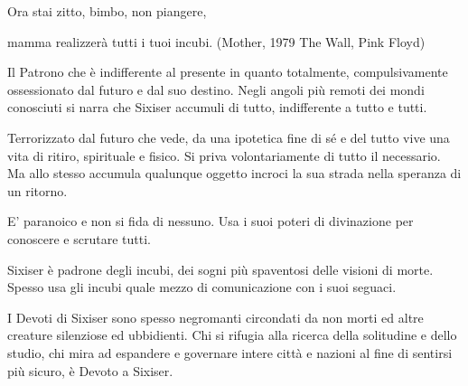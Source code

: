 \begin{multicols}{2}
\begin{enfasi}
{Ora stai zitto, bimbo, non piangere,

mamma realizzerà tutti i tuoi incubi. (Mother, 1979 The Wall, Pink Floyd)

}\end{enfasi}

Il Patrono che è indifferente al presente in quanto totalmente, compulsivamente ossessionato dal futuro e dal suo destino. Negli angoli più remoti dei mondi conosciuti si narra che Sixiser accumuli di tutto, indifferente a tutto e tutti.

Terrorizzato dal futuro che vede, da una ipotetica fine di sé e del tutto vive una vita di ritiro, spirituale e fisico. Si priva volontariamente di tutto il necessario. Ma allo stesso accumula qualunque oggetto incroci la sua strada nella speranza di un ritorno.

E' paranoico e non si fida di nessuno. Usa i suoi poteri di divinazione per conoscere e scrutare tutti.

Sixiser è padrone degli incubi, dei sogni più spaventosi delle visioni di morte. Spesso usa gli incubi quale mezzo di comunicazione con i suoi seguaci.

I Devoti di Sixiser sono spesso negromanti circondati da non morti ed altre creature silenziose ed ubbidienti. Chi si rifugia alla ricerca della solitudine e dello studio, chi mira ad espandere e governare intere città e nazioni al fine di sentirsi più sicuro, è Devoto a Sixiser.


\end{multicols}
